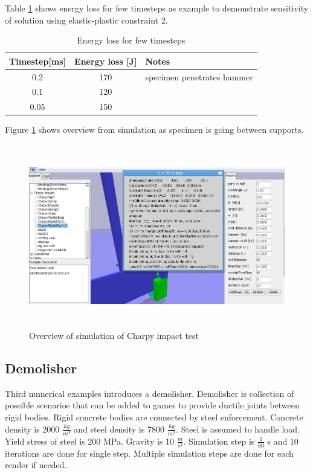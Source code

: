 Table \ref{tab:ep2ts} shows energy loss for few timesteps as example to demonstrate sensitivity of solution
using  elastic-plastic constraint 2.

\begin {table}[htb!]
\caption {Energy loss for few timesteps}
\label{tab:ep2ts} 
\begin{center}
\begin{tabular}{| c| c|l|}
\hline
{\bf Timestep[ms]} & {\bf Energy loss [J]} & {\bf Notes} \\ \hline
 0.2 &  170 & specimen penetrates hammer  \\ \hline
 0.1 &  120 & \\ \hline
 0.05 &  150 & \\ \hline
\end {tabular}
\end{center}
\end {table}

Figure \ref{fig:charpy} shows overview from simulation as specimen is going between supports.

\begin{figure}[htb!]
\centering
\includegraphics[height=8cm]{figs/article-charpy}
\caption{Overview of simulation of Charpy impact test}
\label{fig:charpy}
\end{figure}



\subsection{Demolisher}
Third numerical examples introduces a demolisher.
Demolisher is collection of possible scenarios that can be added to games to provide ductile joints between
rigid bodies.  Rigid concrete bodies are connected by steel enforcement.
Concrete density is 2000 $\frac{kg}{m^3}$ and steel density is 7800 $\frac{kg}{m^3}$. 
Steel is assumed to handle load. Yield stress of steel is 200 MPa.
Gravity is 10  $\frac{m}{s^2}$. Simulation step is $\frac{1}{60} $ s and 10 
iterations are done for single step. Multiple simulation steps are done for each render if needed.

